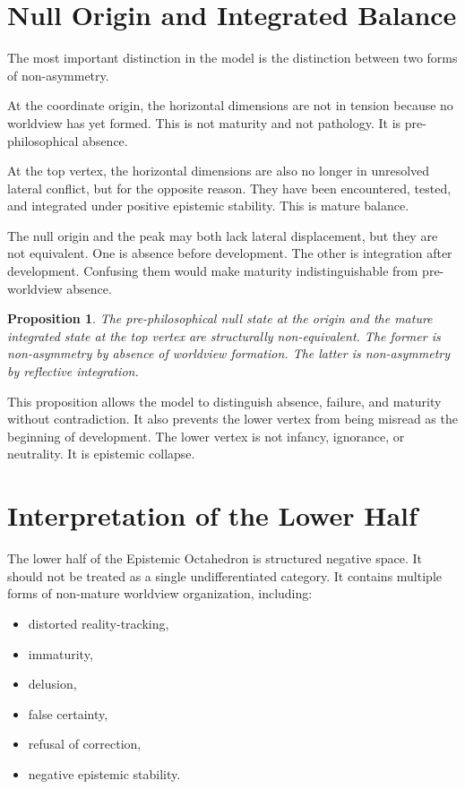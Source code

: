 \documentclass[11pt]{article}
\newtheorem{proposition}{Proposition}
\begin{document}
\section{Null Origin and Integrated Balance}

The most important distinction in the model is the distinction between two forms of non-asymmetry.

At the coordinate origin, the horizontal dimensions are not in tension because no worldview has yet formed. This is not maturity and not pathology. It is pre-philosophical absence.

At the top vertex, the horizontal dimensions are also no longer in unresolved lateral conflict, but for the opposite reason. They have been encountered, tested, and integrated under positive epistemic stability. This is mature balance.

The null origin and the peak may both lack lateral displacement, but they are not equivalent. One is absence before development. The other is integration after development. Confusing them would make maturity indistinguishable from pre-worldview absence.

\begin{proposition}
The pre-philosophical null state at the origin and the mature integrated state at the top vertex are structurally non-equivalent. The former is non-asymmetry by absence of worldview formation. The latter is non-asymmetry by reflective integration.
\end{proposition}

This proposition allows the model to distinguish absence, failure, and maturity without contradiction. It also prevents the lower vertex from being misread as the beginning of development. The lower vertex is not infancy, ignorance, or neutrality. It is epistemic collapse.

\section{Interpretation of the Lower Half}

The lower half of the Epistemic Octahedron is structured negative space. It should not be treated as a single undifferentiated category. It contains multiple forms of non-mature worldview organization, including:

\begin{itemize}
    \item distorted reality-tracking,
    \item immaturity,
    \item delusion,
    \item false certainty,
    \item refusal of correction,
    \item negative epistemic stability.
\end{itemize}
\end{document}
